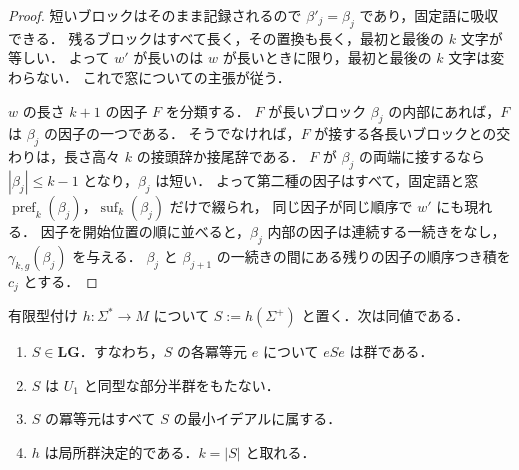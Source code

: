 \begin{proof}
短いブロックはそのまま記録されるので $\beta'_j=\beta_j$ であり，固定語に吸収できる．
残るブロックはすべて長く，その置換も長く，最初と最後の $k$ 文字が等しい．
よって $w'$ が長いのは $w$ が長いときに限り，最初と最後の $k$ 文字は変わらない．
これで窓についての主張が従う．

$w$ の長さ $k+1$ の因子 $F$ を分類する．
$F$ が長いブロック $\beta_j$ の内部にあれば，$F$ は $\beta_j$ の因子の一つである．
そうでなければ，$F$ が接する各長いブロックとの交わりは，長さ高々 $k$ の接頭辞か接尾辞である．
$F$ が $\beta_j$ の両端に接するなら $|\beta_j|\le k-1$ となり，$\beta_j$ は短い．
よって第二種の因子はすべて，固定語と窓
$\operatorname{pref}_k(\beta_j)$，$\operatorname{suf}_k(\beta_j)$ だけで綴られ，
同じ因子が同じ順序で $w'$ にも現れる．
因子を開始位置の順に並べると，$\beta_j$ 内部の因子は連続する一続きをなし，
$\gamma_{k,g}(\beta_j)$ を与える．
$\beta_j$ と $\beta_{j+1}$ の一続きの間にある残りの因子の順序つき積を $c_j$ とする．
\end{proof}

\begin{theorem}[局所群正像の特徴づけ]
\label{thm:lg-characterization}
有限型付け $h:\Sigma^*\to M$ について $S:=h(\Sigma^+)$ と置く．次は同値である．
\begin{enumerate}[label=\textup{(\roman*)},leftmargin=*]
\item $S\in\mathbf{LG}$．すなわち，$S$ の各冪等元 $e$ について $eSe$ は群である．
\item $S$ は $U_1$ と同型な部分半群をもたない．
\item $S$ の冪等元はすべて $S$ の最小イデアルに属する．
\item $h$ は局所群決定的である．$k=|S|$ と取れる．
\end{enumerate}
\end{theorem}

